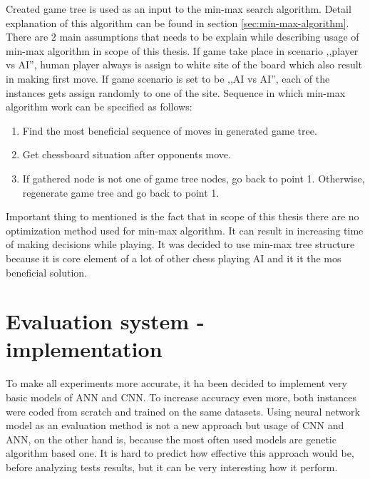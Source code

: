 Created game tree is used as an input to the min-max search algorithm. Detail explanation of this algorithm can be found in section \ref{sec:min-max-algorithm}. There are 2 main assumptions that needs to be explain while describing usage of min-max algorithm in scope of this thesis. If game take place in scenario ,,player vs AI'', human player always is assign to white site of the board which also result in making first move. If game scenario is set to be ,,AI vs AI'', each of the instances gets assign randomly to one of the site. Sequence in which min-max algorithm work can be specified as follows:
\begin{enumerate}
	\item Find the most beneficial sequence of moves in generated game tree.
	\item Get chessboard situation after opponents move.
	\item If gathered node is not one of game tree nodes, go back to point 1. Otherwise, regenerate game tree and go back to point 1.
\end{enumerate}
Important thing to mentioned is the fact that in scope of this thesis there are no optimization method used for min-max algorithm. It can result in increasing time of making decisions while playing. It was decided to use min-max tree structure because it is core element of a lot of other chess playing AI and it it the mos beneficial solution. 

\section{Evaluation system - implementation}
To make all experiments more accurate, it ha been decided to implement very basic models of ANN and CNN. To increase accuracy even more, both instances were coded from scratch and trained on the same datasets. Using neural network model as an evaluation method is not a new approach but usage of CNN and ANN, on the other hand is, because the most often used models are genetic algorithm based one. It is hard to predict how effective this approach would be, before analyzing tests results, but it can be very interesting how it perform. 

